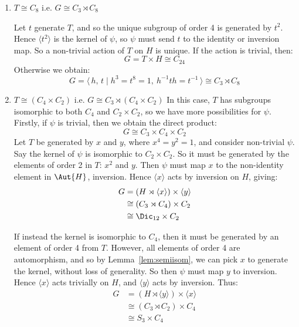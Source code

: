 \begin{enumerate}
    \item \(T \cong C_8\) i.e. \(G \cong C_3 \rtimes C_8\)

        Let \(t\) generate \(T\), and so the unique subgroup of order 4 is generated by \(t^2\).
        Hence \(\langle t^2 \rangle\) is the kernel of \(\psi\), so \(\psi\) must send \(t\) to the identity or
        inversion map.
        So a non-trivial action of \(T\) on \(H\) is unique.
        If the action is trivial, then:
        \[G = T \times H \cong C_{24}\]
        Otherwise we obtain:
        \[G = \langle\, h,\,t \mid h^3 = t^8 = 1,\ h^{-1}th = t^{-1}\,\rangle \cong C_3 \rtimes C_8\]

    \item \(T \cong (C_4 \times C_2)\) i.e. \(G \cong C_3 \rtimes (C_4 \times C_2)\)
        In this case, \(T\) has subgroups isomorphic to both \(C_4\) and \(C_2 \times C_2\), so we have more
        possibilities for \(\psi\).
        Firstly, if \(\psi\) is trivial, then we obtain the direct product:
        \[G \cong C_3 \times C_4 \times C_2\]
        Let \(T\) be generated by \(x\) and \(y\), where \(x^4 = y^2 = 1\), and consider non-trivial \(\psi\).
        Say the kernel of \(\psi\) is isomorphic to \(C_2 \times C_2\).
        So it must be generated by the elements of order 2 in \(T\): \(x^2\) and \(y\).
        Then \(\psi\) must map \(x\) to the non-identity element in \(\Aut{H}\), inversion.
        Hence \(\langle x \rangle\) acts by inversion on \(H\), giving:
        \begin{equation*}
        \begin{aligned}
            G &= (H \rtimes \langle x \rangle) \times \langle y \rangle \\
            &\cong (C_3 \rtimes C_4) \times C_2 \\
            &\cong \Dic_{12} \times C_2
        \end{aligned}
        \end{equation*}

        If instead the kernel is isomorphic to \(C_4\), then it must be generated by an element of order 4 from \(T\).
        However, all elements of order 4 are automorphism, and so by Lemma~\ref{lem:semiisom}, we can pick \(x\) to
        generate the kernel, without loss of generality.
        So then \(\psi\) must map \(y\) to inversion.
        Hence \(\langle x \rangle\) acts trivially on \(H\), and \(\langle y \rangle\) acts by inversion.
        Thus:
        \begin{equation*}
        \begin{aligned}
            G &= (H \rtimes \langle y \rangle) \times \langle x \rangle \\
            &\cong (C_3 \rtimes C_2) \times C_4 \\
            &\cong S_3 \times C_4
        \end{aligned}
        \end{equation*}


\end{enumerate}
